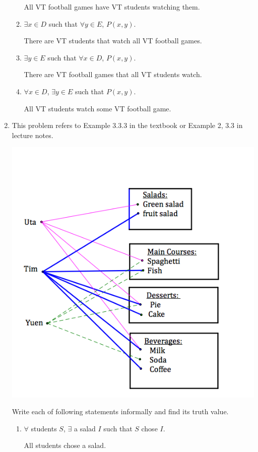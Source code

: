 \documentclass[12pt,letterpaper,titlepage]{article}
\begin{document}
\begin{raggedright}
\begin{enumerate}
\begin{enumerate}[label=(\alph*)]
	  All VT football games have VT students watching them.    

    \item $\exists x \in D$ such that $\forall y \in E$, $P(x, y)$.

	  There are VT students that watch all VT football games.

    \item $\exists y \in E$ such that $\forall x \in D$, $P(x, y)$.

	  There are VT football games that all VT students watch.

    \item $\forall x \in D$, $\exists y \in E$ such that $P(x, y)$.

	  All VT students watch some VT football game.

  \end{enumerate}

\pagebreak

\item This problem refers to Example 3.3.3 in the textbook or Example 2, 3.3 in lecture notes.

\begin{center}
\includegraphics[width=.5\textwidth, height=\textheight, keepaspectratio=true]{hw3q7}
\end{center}

Write each of following statements informally and find its truth value.

  \begin{enumerate}[label=(\alph*)]
    \item $\forall$ students $S$, $\exists$ a salad $I$ such that $S$ chose $I$.
    
	  All students chose a salad.   
    

\end{enumerate}
\end{enumerate}
\end{raggedright}
\end{document}
